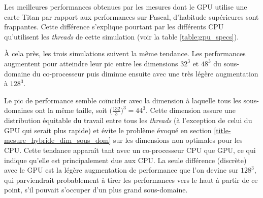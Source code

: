 Les meilleures performances obtenues par les mesures dont le \acs{GPU} utilise une carte Titan par rapport aux performances sur Pascal, d'habitude supérieures sont frappantes. Cette différence s'explique pourtant par les différents \acs{CPU} qu'utilisent les \textit{threads} de cette simulation (voir la table \ref{table:gpu_specs}).

À cela près, les trois simulations suivent la même tendance. Les performances augmentent pour atteindre leur pic entre les dimensions $32^3$ et $48^3$ du sous-domaine du co-processeur puis diminue ensuite avec une très légère augmentation à $128^3$.

Le pic de performance semble coïncider avec la dimension à laquelle tous les sous-domaines ont la même taille, soit $\big(\frac{132}{3}\big)^3 = 44^3$. Cette dimension assure une distribution équitable du travail entre tous les \textit{threads} (à l'exception de celui du \acs{GPU} qui serait plus rapide) et évite le problème évoqué en section \ref{title-mesure_hybride_dim_sous_dom} sur  les dimensions non optimales pour les \acs{CPU}. Cette tendance apparaît tant avec un co-processeur \acs{CPU} que \acs{GPU}, ce qui indique qu'elle est principalement due aux \acs{CPU}. La seule différence (discrète) avec le \acs{GPU} est la légère augmentation de performance que l'on devine sur $128^3$, qui parviendrait probablement à tirer les performances vers le haut à partir de ce point, s'il pouvait s'occuper d'un plus grand sous-domaine.
  
